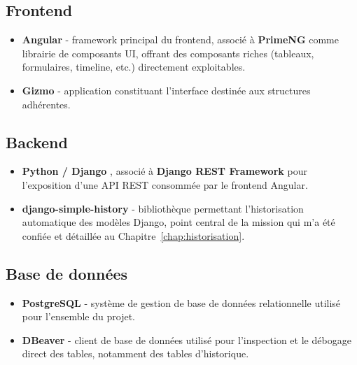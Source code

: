 \subsection{Frontend}
\begin{itemize}
  \item \textbf{Angular}   -  framework
        principal du frontend, associé à \textbf{PrimeNG} comme
        librairie de composants UI, offrant des composants riches
        (tableaux, formulaires, timeline, etc.) directement exploitables.
  \item \textbf{Gizmo}   -  application
        constituant l'interface destinée aux structures adhérentes.
\end{itemize}

\subsection{Backend}
\begin{itemize}
  \item \textbf{Python / Django} ,
        associé à \textbf{Django REST Framework} pour l'exposition d'une
        API REST consommée par le frontend Angular.
  \item \textbf{django-simple-history}  -  bibliothèque permettant
        l'historisation automatique des modèles Django, point central
        de la mission qui m'a été confiée et détaillée au
        Chapitre~\ref{chap:historisation}.
\end{itemize}

\subsection{Base de données}
\begin{itemize}
  \item \textbf{PostgreSQL}   -  système de
        gestion de base de données relationnelle utilisé pour l'ensemble
        du projet.
  \item \textbf{DBeaver}   -  client de base
        de données utilisé pour l'inspection et le débogage direct des
        tables, notamment des tables d'historique.
\end{itemize}

